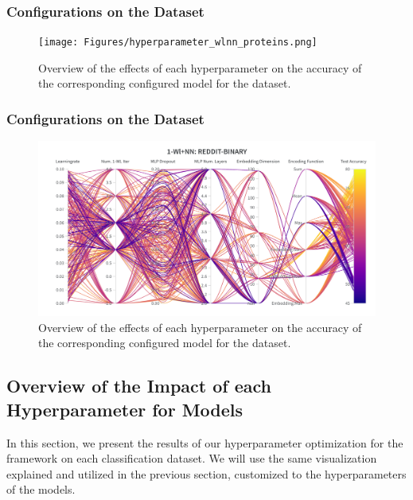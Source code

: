 \subsubsection{\wlnn Configurations on the \proteins Dataset}
\begin{figure}[H]
    \centering
    \texttt{[image: Figures/hyperparameter\_wlnn\_proteins.png]}
    \caption{Overview of the effects of each hyperparameter on the accuracy of the corresponding configured \wlnn model for the \proteins dataset.}
\end{figure}

\subsubsection{\wlnn Configurations on the \reddit Dataset}
\begin{figure}[H]
    \centering
    \includegraphics[width=\textwidth, trim={0 75 0 150}, clip]{Figures/hyperparameter_wlnn_reddit.png}
    \caption{Overview of the effects of each hyperparameter on the accuracy of the corresponding configured \wlnn model for the \reddit dataset.}
\end{figure}
\clearpage


\subsection{Overview of the Impact of each Hyperparameter for \gnn Models}
In this section, we present the results of our hyperparameter optimization for the \gnn framework on each classification dataset. We will use the same visualization explained and utilized in the previous section, customized to the hyperparameters of the \gnn models.

